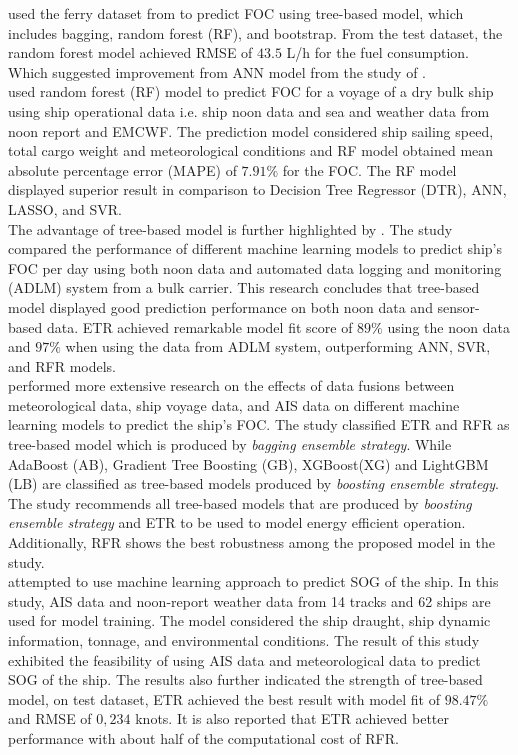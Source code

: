  used the ferry dataset from  to predict FOC using tree-based model, which includes bagging, random forest (RF), and bootstrap. From the test dataset, the random forest model achieved RMSE of $43.5$ L/h for the fuel consumption. Which suggested improvement from ANN model from the study of .\\ 

 used random forest (RF) model to predict FOC for a voyage of a dry bulk ship using ship operational data i.e. ship noon data and sea and weather data from noon report and EMCWF. The prediction model considered ship sailing speed, total cargo weight and meteorological conditions and  RF model obtained mean absolute percentage error (MAPE) of $7.91\%$ for the FOC. The RF model displayed superior result in comparison to Decision Tree Regressor (DTR), ANN, LASSO, and SVR.\\      

The advantage of tree-based model is further highlighted by . The study compared the performance of different machine learning models to predict ship's FOC per day using both noon data and automated data logging and monitoring (ADLM) system from a bulk carrier. This research concludes that tree-based model displayed good prediction performance on both noon data and sensor-based data. ETR achieved remarkable model fit score of $89\%$ using the noon data and $97\%$ when using the data from ADLM system, outperforming ANN, SVR, and RFR models.\\

 performed more extensive research on the effects of data fusions between meteorological data, ship voyage data, and AIS data on different machine learning models to predict the ship's FOC. The study classified ETR and RFR as tree-based model which is produced by \emph{bagging ensemble strategy}. While AdaBoost (AB), Gradient Tree Boosting (GB), XGBoost(XG) and LightGBM (LB) are classified as tree-based models produced by \emph{boosting ensemble strategy}. The study recommends all tree-based models that are produced by \emph{boosting ensemble strategy} and ETR to be used to model energy efficient operation. Additionally, RFR shows the best robustness among the proposed model in the study.\\

 attempted to use machine learning approach to predict SOG of the ship. In this study, AIS data and noon-report weather data from 14 tracks and 62 ships are used for model training. The model considered the ship draught, ship dynamic information, tonnage, and environmental conditions. The result of this study exhibited the feasibility of using AIS data and meteorological data to predict SOG of the ship. The results also further indicated the strength of tree-based model, on test dataset, ETR achieved the best result with model fit of $98.47\%$ and RMSE of $0,234$ knots. It is also reported that ETR achieved better performance with about half of the computational cost of RFR.\\ 

